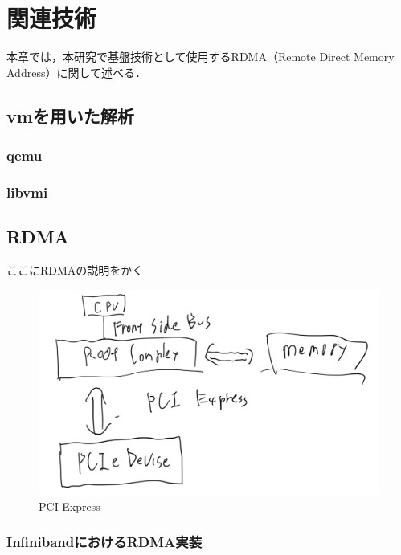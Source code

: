 \chapter{関連技術}
\label{chap:related_works}

本章では，本研究で基盤技術として使用するRDMA（Remote Direct Memory Address）に関して述べる．

\section{vmを用いた解析}

\subsection{qemu}

\subsection{libvmi}

\section{RDMA}

ここにRDMAの説明をかく

\begin{figure}[htbp]
    \caption{PCI Express}
    \label{fig:zentai}
    \begin{center}
        \includegraphics[bb=0 0 1000 400,width=15cm]{img/tegaki/pcie.png}
    \end{center}
\end{figure}

\subsection{InfinibandにおけるRDMA実装}

